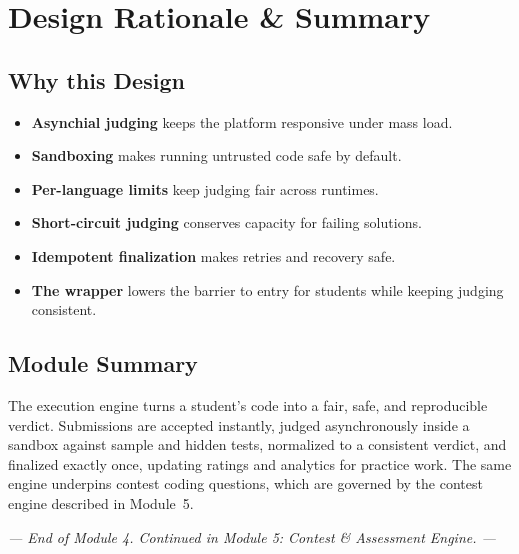\documentclass[12pt,a4paper,oneside]{report}
\begin{document}
\chapter{Design Rationale \& Summary}
\section{Why this Design}
\begin{itemize}[leftmargin=1.5em]
  \item \textbf{Asynchial judging} keeps the platform responsive under mass load.
  \item \textbf{Sandboxing} makes running untrusted code safe by default.
  \item \textbf{Per-language limits} keep judging fair across runtimes.
  \item \textbf{Short-circuit judging} conserves capacity for failing solutions.
  \item \textbf{Idempotent finalization} makes retries and recovery safe.
  \item \textbf{The wrapper} lowers the barrier to entry for students while
        keeping judging consistent.
\end{itemize}

\section{Module Summary}
The execution engine turns a student's code into a fair, safe, and reproducible
verdict. Submissions are accepted instantly, judged asynchronously inside a
sandbox against sample and hidden tests, normalized to a consistent verdict,
and finalized exactly once, updating ratings and analytics for practice work.
The same engine underpins contest coding questions, which are governed by the
contest engine described in Module~5.

\vspace{0.6cm}
\begin{center}
\textit{--- End of Module 4. Continued in Module 5: Contest \& Assessment Engine. ---}
\end{center}
\end{document}
